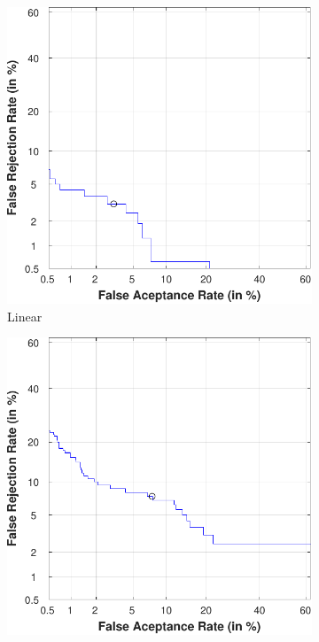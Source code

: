 \documentclass[a4paper]{article}
\begin{document}
  \begin{figure}[H]
    \centering
         \begin{subfigure}[t]{0.32\textwidth}
           \centering
           \includegraphics[scale=0.4]{Figures/SVM-Linear}
           \caption{Linear}
       \end{subfigure}%
       \quad
       \begin{subfigure}[t]{0.32\textwidth}
           \centering
           \includegraphics[scale=0.4]{Figures/SVM-POLY}

\end{subfigure}
\end{figure}
\end{document}
